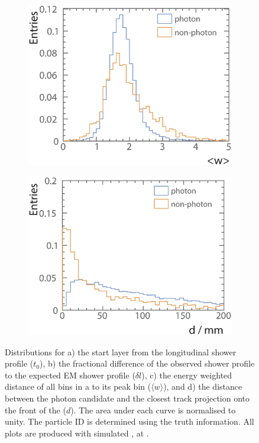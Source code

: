 \begin{figure}[tbph]
\begin{subfigure}[b]{0.45\textwidth}
    \includegraphics[width=\textwidth]{photon/likelihood/PeakRms2}
    \caption{}
    \label{fig:photonPeakRms}
  \end{subfigure}
  \begin{subfigure}[b]{0.45\textwidth}
    \includegraphics[width=\textwidth]{photon/likelihood/MinDistanceToTrack2}
    \caption{}
    \label{fig:photonMinDistanceToTrack}
  \end{subfigure}
\caption
{Distributions for a) the start layer from the longitudinal shower profile ($t_0$), b)  the fractional difference of the observed shower profile to the expected EM shower profile ($\delta{l}$), c) the energy weighted \rms distance of all bins in a \ShowerPeak to its peak bin ($\langle{w}\rangle$), and d) the distance between the photon candidate and the closest track projection onto the front of the \ECAL ($d$). The area under each curve is normalised to unity. The particle ID is determined using the truth information. All plots are produced with  simulated \eeZuds, at .}
\label{fig:photonVarLikelihood}
\end{figure}



